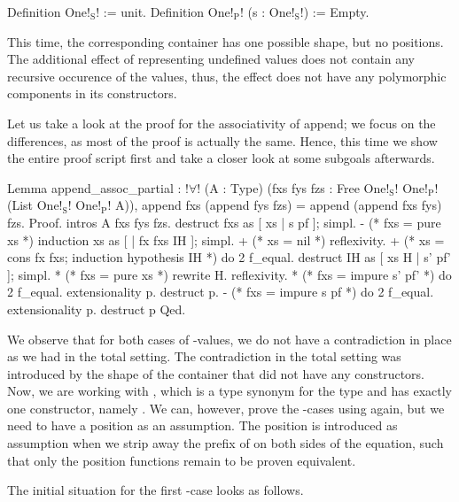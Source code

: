 \begin{coqcode}
Definition One!$_\text{S}$! := unit.
Definition One!$_\text{P}$! (s : One!$_\text{S}$!) := Empty.
\end{coqcode}

This time, the corresponding container has one possible shape, but no positions.
The additional effect of representing undefined values does not contain any recursive occurence of the  values, thus, the effect does not have any polymorphic components in its constructors.

Let us take a look at the proof for the associativity of append; we focus on the differences, as most of the proof is actually the same.
Hence, this time we show the entire proof script first and take a closer look at some subgoals afterwards.

\begin{coqcode}
Lemma append_assoc_partial :
 !$\forall$! (A : Type) (fxs fys fzs : Free One!$_\text{S}$! One!$_\text{P}$! (List One!$_\text{S}$! One!$_\text{P}$! A)),
   append fxs (append fys fzs) = append (append fxs fys) fzs.
Proof.
 intros A fxs fys fzs.
 destruct fxs as [ xs | s pf ]; simpl.
 - (* fxs = pure xs *) induction xs as [ | fx fxs IH ]; simpl.
   + (* xs = nil *) reflexivity.
   + (* xs = cons fx fxs; induction hypothesis IH *)
     do 2 f_equal. destruct IH as [ xs H | s' pf' ]; simpl.
     * (* fxs = pure xs *) rewrite H. reflexivity.
     * (* fxs = impure s' pf' *)
       do 2 f_equal. extensionality p. destruct p.
  - (* fxs = impure s pf *)
    do 2 f_equal. extensionality p. destruct p
Qed.
\end{coqcode}

We observe that for both cases of \--values, we do not have a contradiction in place as we had in the total setting.
The contradiction in the total setting was introduced by the shape of the container that did not have any constructors.
Now, we are working with , which is a type synonym for the  type and has exactly one constructor, namely .
We can, however, prove the \--cases using  again, but we need to have a position as an assumption.
The position is introduced as assumption when we strip away the prefix of  on both sides of the equation, such that only the position functions  remain to be proven equivalent.

The initial situation for the first \--case looks as follows.

